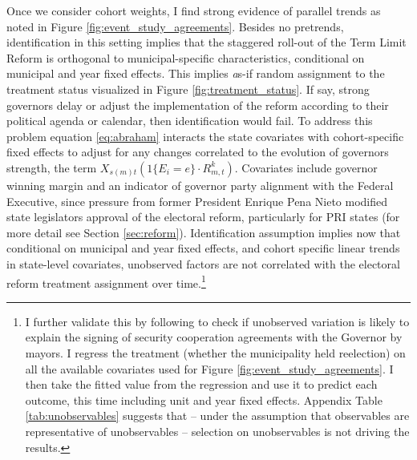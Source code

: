 \documentclass[12pt]{amsart}
\makeatletter
\def\subsection{\@startsection{subsection}{2}
	\z@{.8\linespacing\@plus.7\linespacing}{.7\linespacing}{\large}}
\numberwithin{equation}{section}
\theoremstyle{definition}
\theoremstyle{definition}
\theoremstyle{definition}
\makeatother
\begin{document}
\subsection{Identification \label{sec:identification}}
 
Once we consider cohort weights, I find strong evidence of parallel trends as noted in Figure \ref{fig:event_study_agreements}. Besides no pretrends, identification in this setting implies that the staggered roll-out of the Term Limit Reform is orthogonal to municipal-specific characteristics, conditional on municipal and year fixed effects. This implies {\emph as-if} random assignment to the treatment status visualized in Figure \ref{fig:treatment_status}. If say, strong governors delay or adjust the implementation of the reform according to their political agenda or calendar, then identification would fail. To address this problem equation \ref{eq:abraham} interacts the state covariates with cohort-specific fixed effects to adjust for any changes correlated to the evolution of governors strength, the term $X_{s(m)t} (1\{E_i=e\} \cdot R^k_{m,t})$. Covariates include governor winning margin and an indicator of governor party alignment with the Federal Executive, since pressure from former President Enrique Pena Nieto modified state legislators approval of the electoral reform, particularly for PRI states (for more detail see Section \ref{sec:reform}). Identification assumption implies now that conditional on municipal and year fixed effects, and cohort specific linear trends in state-level covariates, unobserved factors are not correlated with the electoral reform treatment assignment over time.\footnote{I further validate this by following \citet{altonji_etal_2005} to check if unobserved variation is likely to explain the signing of security cooperation agreements with the Governor by mayors. I regress the treatment (whether the municipality held reelection) on all the available covariates used for Figure \ref{fig:event_study_agreements}. I then take the fitted value from the regression and use it to predict each outcome, this time including unit and year fixed effects. Appendix Table \ref{tab:unobservables} suggests that – under the assumption that observables are representative of unobservables – selection on unobservables is not driving the results.}   
\end{document}
